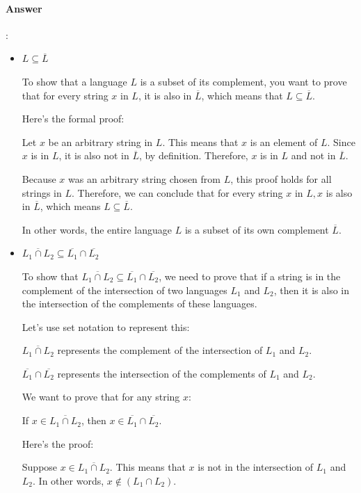 \documentclass{article}
\begin{document}
\paragraph{Answer}:


\begin{itemize}
  \item $L \subseteq \overline{L}$
  
  To show that a language $L$ is a subset of its complement, you want to prove that for every string $x$ in $L$, it is also in $\overline{L}$, which means that $L \subseteq \overline{L}$.

  Here's the formal proof:

  Let $x$ be an arbitrary string in $L$. This means that $x$ is an element of $L$. Since $x$ is in $L$, it is also not in $\overline{L}$, by definition. Therefore, $x$ is in $L$ and not in $\overline{L}$.

  Because $x$ was an arbitrary string chosen from $L$, this proof holds for all strings in $L$. Therefore, we can conclude that for every string $x$ in $L, x$ is also in $\overline{L}$, which means $L \subseteq \overline{L}$.

  In other words, the entire language $L$ is a subset of its own complement $\overline{L}$.

  \item $\overline{ L_1 \cap L_2 } \subseteq \overline{L_1} \cap \overline{L_2}$
  
  To show that $\overline{L_1 \cap L_2} \subseteq \overline{L_1} \cap \overline{L_2}$, we need to prove that if a string is in the complement of the intersection of two languages $L_1$ and $L_2$, then it is also in the intersection of the complements of these languages.

  Let's use set notation to represent this:
  
  $\overline{L_1 \cap L_2}$ represents the complement of the intersection of $L_1$ and $L_2$.
  
  $\overline{L_1} \cap \overline{L_2}$ represents the intersection of the complements of $L_1$ and $L_2$.
  
  We want to prove that for any string $x$:
  
  If $x \in \overline{L_1 \cap L_2}$, then $x \in \overline{L_1} \cap \overline{L_2}$.
  
  Here's the proof:
  
  Suppose $x \in \overline{L_1 \cap L_2}$. This means that $x$ is not in the intersection of $L_1$ and $L_2$. In other words, $x \notin (L_1 \cap L_2)$.
  

\end{itemize}
\end{document}
